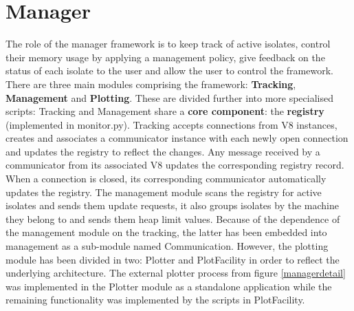 \documentclass{l4proj}
\begin{document}
\section{Manager}
\hspace*{3em} The role of the manager framework is to keep track of active isolates, control their memory usage by applying a management policy, give feedback on the status of each isolate to the user and allow the user to control the framework. There are three main modules comprising the framework: \textbf{Tracking}, \textbf{Management} and \textbf{Plotting}. These are divided further into more specialised scripts:
\hspace*{3em} Tracking and Management share a \textbf{core component}: the \textbf{registry} (implemented in monitor.py). Tracking accepts connections from V8 instances, creates and associates a communicator instance with each newly open connection and updates the registry to reflect the changes. Any message received by a communicator from its associated V8 updates the corresponding registry record. When a connection is closed, its corresponding communicator automatically updates the registry. The management module scans the registry for active isolates and sends them update requests, it also groups isolates by the machine they belong to and sends them heap limit values. Because of the dependence of the management module on the tracking, the latter has been embedded into management as a sub-module named Communication. However, the plotting module has been divided in two: Plotter and PlotFacility in order to reflect the underlying architecture. The external plotter process from figure \ref{managerdetail} was implemented in the Plotter module as a standalone application while the remaining functionality was implemented by the scripts in PlotFacility. 
\end{document}
